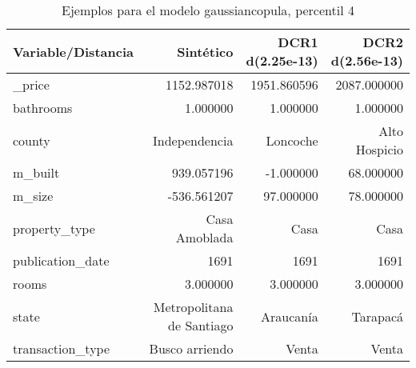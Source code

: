 \begin{table}[H]
\centering
\fontsize{10}{14}\selectfont
\caption{Ejemplos para el modelo gaussiancopula, percentil 4}
\label{table-example-economicos-b-2-gaussiancopula-4p}
\begin{tabular}{|l|r|r|r|}
\hline
\rowcolor[gray]{0.8}
Variable/Distancia & Sintético & DCR1 d(2.25e-13) & DCR2 d(2.56e-13) \\
\hline \_price & \cellcolor[rgb]{0.9, 0.54, 0.52} 1152.987018 & 1951.860596 & 2087.000000 \\
\hline bathrooms & \cellcolor[rgb]{0.9, 0.54, 0.52} 1.000000 & \cellcolor[rgb]{0.9, 0.54, 0.52} 1.000000 & \cellcolor[rgb]{0.9, 0.54, 0.52} 1.000000 \\
\hline county & \cellcolor[rgb]{0.9, 0.54, 0.52} Independencia & Loncoche & Alto Hospicio \\
\hline m\_built & \cellcolor[rgb]{0.9, 0.54, 0.52} 939.057196 & -1.000000 & 68.000000 \\
\hline m\_size & \cellcolor[rgb]{0.9, 0.54, 0.52} -536.561207 & 97.000000 & 78.000000 \\
\hline property\_type & \cellcolor[rgb]{0.9, 0.54, 0.52} Casa Amoblada & Casa & Casa \\
\hline publication\_date & \cellcolor[rgb]{0.9, 0.54, 0.52} 1691 & \cellcolor[rgb]{0.9, 0.54, 0.52} 1691 & \cellcolor[rgb]{0.9, 0.54, 0.52} 1691 \\
\hline rooms & \cellcolor[rgb]{0.9, 0.54, 0.52} 3.000000 & \cellcolor[rgb]{0.9, 0.54, 0.52} 3.000000 & \cellcolor[rgb]{0.9, 0.54, 0.52} 3.000000 \\
\hline state & \cellcolor[rgb]{0.9, 0.54, 0.52} Metropolitana de Santiago & Araucanía & Tarapacá \\
\hline transaction\_type & \cellcolor[rgb]{0.9, 0.54, 0.52} Busco arriendo & Venta & Venta \\
\hline
\end{tabular}
\end{table}

